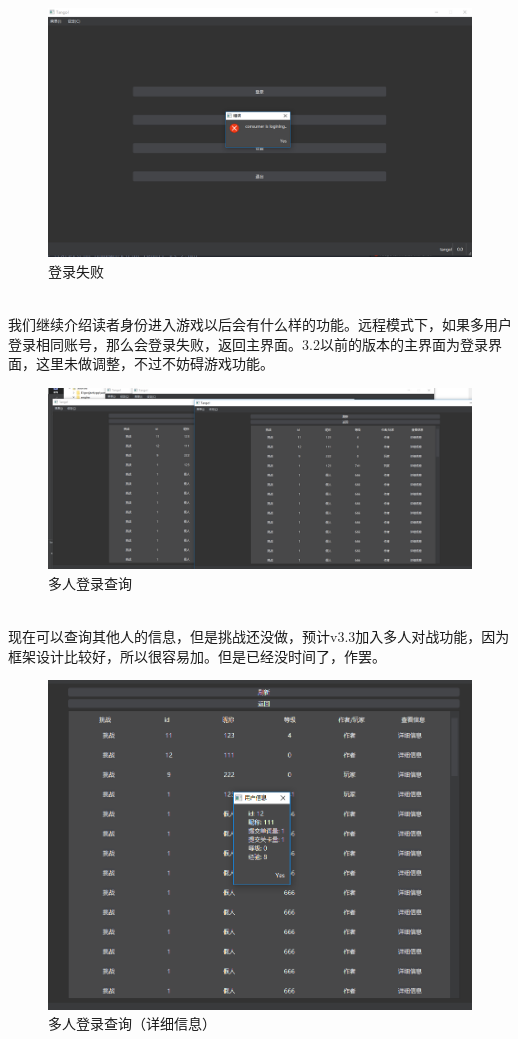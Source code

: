 \documentclass[UTF8]{ctexart}
\begin{document}
\begin{figure}[!ht]
    \centering
    \includegraphics[scale=0.3]{./images/rpur.png}
    \caption{登录失败}
\end{figure}\\
\indent 我们继续介绍读者身份进入游戏以后会有什么样的功能。远程模式下，如果多用户登录相同账号，那么会登录失败，返回主界面。3.2以前的版本的主界面为登录界面，这里未做调整，不过不妨碍游戏功能。
\begin{figure}[!ht]
    \centering
    \includegraphics[scale=0.23]{./images/multi.png}
    \caption{多人登录查询}
\end{figure}\\
\indent 现在可以查询其他人的信息，但是挑战还没做，预计v3.3加入多人对战功能，因为框架设计比较好，所以很容易加。但是已经没时间了，作罢。
\begin{figure}[!ht]
    \centering
    \includegraphics[scale=0.35]{./images/infose.png}
    \caption{多人登录查询（详细信息）}
\end{figure}\\
\end{document}
